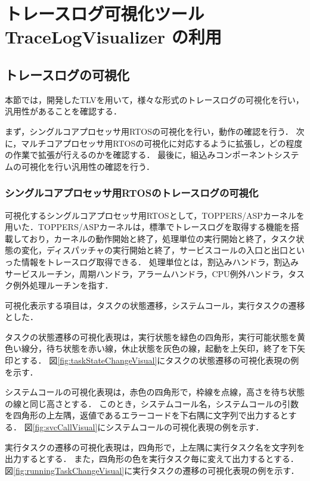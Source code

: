 \chapter{トレースログ可視化ツール TraceLogVisualizer の利用}

\section{トレースログの可視化}
本節では，開発したTLVを用いて，様々な形式のトレースログの可視化を行い，汎用性があることを確認する．

まず，シングルコアプロセッサ用RTOSの可視化を行い，動作の確認を行う．
次に，マルチコアプロセッサ用RTOSの可視化に対応するように拡張し，どの程度の作業で拡張が行えるのかを確認する．
最後に，組込みコンポーネントシステムの可視化を行い汎用性の確認を行う．

\subsection{シングルコアプロセッサ用RTOSのトレースログの可視化}
可視化するシングルコアプロセッサ用RTOSとして，TOPPERS/ASPカーネルを用いた．TOPPERS/ASPカーネルは，標準でトレースログを取得する機能を搭載しており，カーネルの動作開始と終了，処理単位の実行開始と終了，タスク状態の変化，ディスパッチャの実行開始と終了，サービスコールの入口と出口といった情報をトレースログ取得できる．
処理単位とは，割込みハンドラ，割込みサービスルーチン，周期ハンドラ，アラームハンドラ，CPU例外ハンドラ，タスク例外処理ルーチンを指す．

可視化表示する項目は，タスクの状態遷移，システムコール，実行タスクの遷移とした．

タスクの状態遷移の可視化表現は，実行状態を緑色の四角形，実行可能状態を黄色い線分，待ち状態を赤い線，休止状態を灰色の線，起動を上矢印，終了を下矢印とする．
図\ref{fig:taskStateChangeVisual}にタスクの状態遷移の可視化表現の例を示す．

システムコールの可視化表現は，赤色の四角形で，枠線を点線，高さを待ち状態の線と同じ高さとする．
このとき，システムコール名，システムコールの引数を四角形の上左隅，返値であるエラーコードを下右隅に文字列で出力するとする．
図\ref{fig:svcCallVisual}にシステムコールの可視化表現の例を示す．

実行タスクの遷移の可視化表現は，四角形で，上左隅に実行タスク名を文字列を出力するとする．
また，四角形の色を実行タスク毎に変えて出力するとする．
図\ref{fig:runningTaskChangeVisual}に実行タスクの遷移の可視化表現の例を示す．

